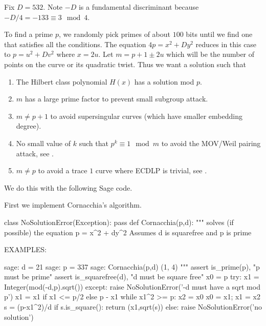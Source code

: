 \documentclass[11pt]{article}
\begin{document}
Fix $D = 532$. Note $-D$ is a fundamental discriminant because $-D/4 = -133 \equiv 3\mod{4}$.

To find a prime $p$, we randomly pick primes of about $100$ bits until we find one that satisfies all the conditions. The equation $4p = x^2 + Dy^2$ reduces in this case to $p = u^2 + Dv^2$ where $x = 2u$. Let $m = p + 1 \pm 2u$ which will be the number of points on the curve or its quadratic twist. Thus we want a solution such that
\begin{enumerate}[$\bullet$]
	\item The Hilbert class polynomial $H(x)$ has a solution mod $p$.
	\item $m$ has a large prime factor to prevent small subgroup attack.
	\item $m \neq p+1$ to avoid supersingular curves (which have smaller embedding degree).
	\item No small value of $k$ such that $p^k\equiv 1\mod{m}$ to avoid the MOV/Weil pairing attack, see \cite[Pg.~169]{hankerson2004guide}.
	\item $m\neq p$ to avoid a trace $1$ curve where ECDLP is trivial, see \cite{nigel1997trace1}.
\end{enumerate}

We do this with the following Sage code.

First we implement Cornacchia's algorithm.
\begin{sagecode}
\begin{sagecell}
class NoSolutionError(Exception):
    pass
def Cornacchia(p,d):
    """
        solves (if possible) the equation
    p = x^2 + dy^2
        Assumes d is squarefree and p is prime

        EXAMPLES:

            sage: d = 21
            sage: p = 337 
            sage: Cornacchia(p,d)
            (1, 4)
    """
    assert is_prime(p), "p must be prime"
    assert is_squarefree(d), "d must be square free"
    x0 = p
    try:
        x1 = Integer(mod(-d,p).sqrt())
    except:
        raise NoSolutionError('-d must have a sqrt mod p')
    x1 = x1 if x1 <= p/2 else p - x1
    while x1^2 >= p:
        x2 = x0%
        x0 = x1; x1 = x2
    s = (p-x1^2)/d
    if s.is_square():
        return (x1,sqrt(s))
    else:
        raise NoSolutionError('no solution')
\end{sagecell}
\end{sagecode}
\end{document}
